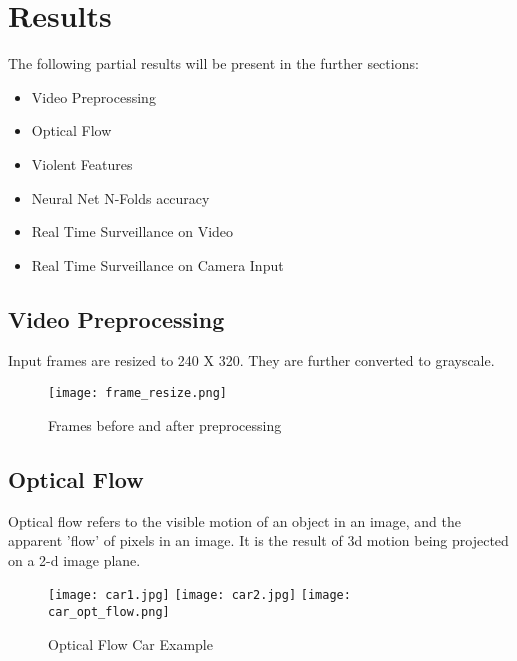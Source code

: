 \clearpage
\chapter{Results}
The following partial results will be present in the further sections:
\begin{itemize}
	\item Video Preprocessing
	\item Optical Flow
	\item Violent Features
	\item Neural Net N-Folds accuracy
	\item Real Time Surveillance on Video
	\item Real Time Surveillance on Camera Input
\end{itemize}
\section{Video Preprocessing}
 Input frames are resized to 240 X 320. They are further converted to grayscale.
\begin{center}
\begin{figure}[H]
\centering
\texttt{[image: frame\_resize.png]}
\caption{Frames before and after preprocessing}
\end{figure}
\end{center}
\section{Optical Flow}
Optical flow refers to the visible motion of an object in an image, and the apparent 'flow' of pixels in an image. It is the result of 3d motion being projected on a 2-d image plane. 
\begin{figure}[htp]
\centering
\texttt{[image: car1.jpg]}\hfill
\texttt{[image: car2.jpg]}\hfill
\texttt{[image: car\_opt\_flow.png]}
\caption{Optical Flow Car Example}
\end{figure}
